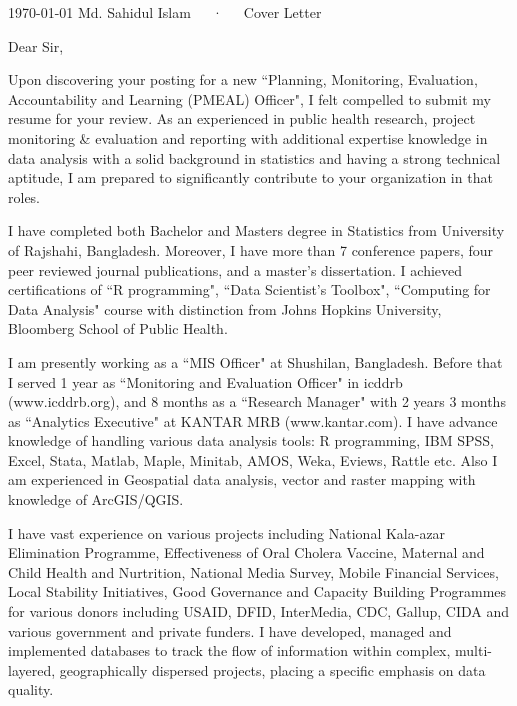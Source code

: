 \documentclass[11pt, a4paper]{awesome-cv}
\begin{document}
\makecvheader[R]

\makecvfooter
  {\today}
  {Md. Sahidul Islam~~~·~~~Cover Letter}
  {}

\makelettertitle

\begin{cvletter}

Dear Sir,

Upon discovering your posting for a new ``Planning, Monitoring, Evaluation, Accountability and Learning (PMEAL) Officer", I felt compelled to submit my resume for your review. As an experienced in public health research,  project monitoring \& evaluation and reporting with additional expertise knowledge in data analysis with a solid background in statistics and having a strong technical aptitude, I am prepared to significantly contribute to your organization in that roles.

I have completed both Bachelor and Masters degree in Statistics from University of Rajshahi, Bangladesh. Moreover, I have more than 7 conference papers, four peer reviewed journal publications, and a master’s dissertation. I achieved certifications of ``R programming", ``Data Scientist's Toolbox", ``Computing for Data Analysis" course with distinction from Johns Hopkins University, Bloomberg School of Public Health.

I am presently working as a ``MIS Officer"  at Shushilan, Bangladesh.  Before that I served 1 year as ``Monitoring and Evaluation Officer" in icddrb (www.icddrb.org), and 8 months as a ``Research Manager" with 2 years 3 months as ``Analytics Executive" at KANTAR MRB (www.kantar.com). I have advance knowledge of handling various data analysis tools: R programming, IBM SPSS, Excel,  Stata, Matlab, Maple, Minitab, AMOS, Weka, Eviews, Rattle etc. Also I am experienced in Geospatial data analysis, vector and raster mapping with knowledge of ArcGIS/QGIS.

I have vast experience on various projects including National Kala-azar Elimination Programme, Effectiveness of Oral Cholera Vaccine, Maternal and Child Health and Nurtrition, National Media Survey, Mobile Financial Services, Local Stability Initiatives, Good Governance and Capacity Building Programmes for various donors including USAID, DFID, InterMedia, CDC, Gallup, CIDA and various government and private funders. I have developed, managed and implemented databases to track the flow of information within complex, multi-layered, geographically dispersed projects, placing a specific emphasis on data quality.




\end{cvletter}
\end{document}
